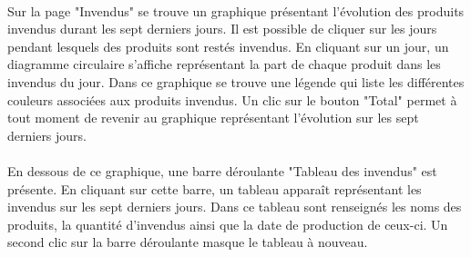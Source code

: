 \paragraph{}
Sur la page "Invendus" se trouve un graphique présentant l'évolution des produits
invendus durant les sept derniers jours. Il est possible de cliquer sur les 
jours pendant lesquels des produits sont restés invendus. En cliquant sur un jour, un 
diagramme circulaire s'affiche représentant la part de chaque produit dans les 
invendus du jour. Dans ce graphique se trouve une légende qui liste les 
différentes couleurs associées aux produits invendus. Un clic sur le bouton 
"Total" permet à tout moment de revenir au graphique représentant l'évolution 
sur les sept derniers jours.

\paragraph{}
En dessous de ce graphique, une barre déroulante "Tableau des invendus" est 
présente. En cliquant sur cette barre, un tableau apparaît représentant les
invendus sur les sept derniers jours. Dans ce tableau sont renseignés les noms 
des produits, la quantité d'invendus ainsi que la date de production de ceux-ci.
Un second clic sur la barre déroulante masque le tableau à nouveau.
